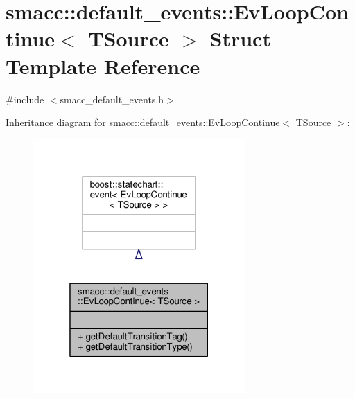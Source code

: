 \hypertarget{structsmacc_1_1default__events_1_1EvLoopContinue}{}\section{smacc\+:\+:default\+\_\+events\+:\+:Ev\+Loop\+Continue$<$ T\+Source $>$ Struct Template Reference}
\label{structsmacc_1_1default__events_1_1EvLoopContinue}


{\ttfamily \#include $<$smacc\+\_\+default\+\_\+events.\+h$>$}



Inheritance diagram for smacc\+:\+:default\+\_\+events\+:\+:Ev\+Loop\+Continue$<$ T\+Source $>$\+:\nopagebreak
\begin{figure}[H]
\begin{center}
\leavevmode
\includegraphics[width=229pt]{structsmacc_1_1default__events_1_1EvLoopContinue__inherit__graph}
\end{center}
\end{figure}


